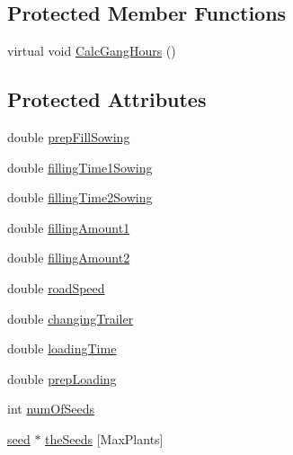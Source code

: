 \subsection*{Protected Member Functions}
\begin{DoxyCompactItemize}
\item 
virtual void \hyperlink{classsow_tech_aec37925c5aa7d1ea82df758921c8fdc3}{CalcGangHours} ()
\end{DoxyCompactItemize}
\subsection*{Protected Attributes}
\begin{DoxyCompactItemize}
\item 
double \hyperlink{classsow_tech_a71b124af038adf72594946368e47d27b}{prepFillSowing}
\item 
double \hyperlink{classsow_tech_a2cc7e4ca798b84613d391afdd10b329f}{fillingTime1Sowing}
\item 
double \hyperlink{classsow_tech_a24d47bf031ea00d206f1dc8dd7aba118}{fillingTime2Sowing}
\item 
double \hyperlink{classsow_tech_a98b1760033ac01469be4a281608de249}{fillingAmount1}
\item 
double \hyperlink{classsow_tech_a7cc699ce5d5c80c6e52b49340058f181}{fillingAmount2}
\item 
double \hyperlink{classsow_tech_a20f695d310362d3df05a4dc9762b07cc}{roadSpeed}
\item 
double \hyperlink{classsow_tech_a07d006768f330cee12e40f2349f545b1}{changingTrailer}
\item 
double \hyperlink{classsow_tech_a44e19de889b77e8bb3dd3bdc6acba256}{loadingTime}
\item 
double \hyperlink{classsow_tech_a37a4ac51de9da38135ebbe406671eddd}{prepLoading}
\item 
int \hyperlink{classsow_tech_ae36e777f99870f8bc819f0239f858583}{numOfSeeds}
\item 
\hyperlink{classseed}{seed} $\ast$ \hyperlink{classsow_tech_a12a77b69512097cce7ae2f0b520c7281}{theSeeds} \mbox{[}MaxPlants\mbox{]}
\end{DoxyCompactItemize}


